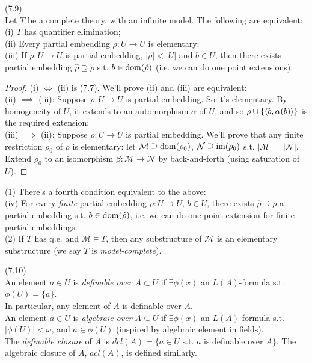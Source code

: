 \documentclass[a4paper]{article}
\begin{document}
\begin{thm} (7.9)\\
    Let $T$ be a complete theory, with an infinite model. The following are equivalent:\\
    (i) $T$ has quantifier elimination;\\
    (ii) Every partial embedding $\rho:U \to U$  is elementary;\\
    (iii) If $\rho:U \to U$ is partial embedding, $|\rho| < |U|$ and $b \in U$, then there exists partial embedding $\hat{\rho}\supseteq \rho$ s.t. $b \in \operatorname{dom}(\hat{\rho})$ (i.e. we can do one point extensions).
    \begin{proof}
        (i) $\iff$ (ii) is (7.7). We'll prove (ii) and (iii) are equivalent:\\
        (ii) $\implies$ (iii): Suppose $\rho:U \to U$ is partial embedding. So it's elementary. By homogeneity of $U$, it extends to an automorphism $\alpha$ of $U$, and so $\rho \cup \{\langle b,\alpha(b)\rangle\}$ is the required extension;\\
        (iii) $\implies$ (ii): Suppose $\rho:U \to U$ is partial embedding. We'll prove that any finite restriction $\rho_0$ of $\rho$ is elementary: let $\mathcal{M} \supseteq \operatorname{dom}(\rho_0)$, $\mathcal{N} \supseteq \operatorname{im}(\rho_0)$ s.t. $|\mathcal{M}| = |\mathcal{N}|$. Extend $\rho_0$ to an isomorphism $\beta:\mathcal{M} \to \mathcal{N}$ by back-and-forth (using saturation of $U$).
    \end{proof}
\end{thm}

\begin{rem}
    (1) There's a fourth condition equivalent to the above:\\
    (iv) For every \emph{finite} partial embedding $\rho:U \to U$, $b \in U$, there exists $\hat{\rho} \supseteq \rho$ a partial embedding s.t. $b \in \operatorname{dom}(\hat{\rho})$, i.e. we can do one point extension for finite partial embeddings.\\
    (2) If $T$ has q.e. and $\mathcal{M} \vDash T$, then any substructure of $\mathcal{M}$ is an elementary substructure (we say $T$ is \emph{model-complete}).
\end{rem}

\begin{defi} (7.10)\\
    An element $a \in U$ is \emph{definable over $A \subset U$} if $\exists \phi(x)$ an $L(A)$-formula s.t. $\phi(U) = \{a\}$.\\
    In particular, any element of $A$ is definable over $A$.\\
    An element $a \in U$ is \emph{algebraic over $A \subseteq U$} if $\exists \phi(x)$ an $L(A)$-formula s.t. $|\phi(U)| < \omega$, and $a \in \phi(U)$ (inspired by algebraic element in fields).\\
    The \emph{definable closure} of $A$ is $dcl(A) = \{a \in U$ s.t. $a$ is definable over $A\}$. The algebraic closure of $A$, $acl(A)$, is defined similarly.
\end{defi}
\end{document}
